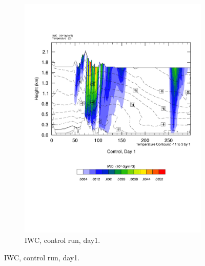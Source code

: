 \begin{figure}[h]
\begin{subfigure}{0.48\textwidth}
        \includegraphics[width=\textwidth]{results/crossSec_IWC_Control_Day1.pdf}
        \caption{IWC, control run, day1.}
        \label{subfig:cross_IWC_day1}
    \end{subfigure}
    

\end{figure}
